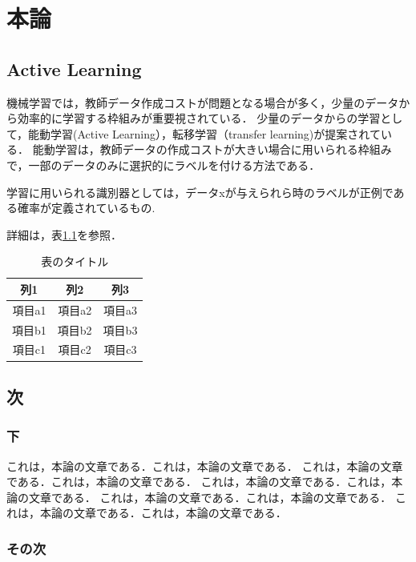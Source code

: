 \chapter{本論}

\section{Active Learning}
機械学習では，教師データ作成コストが問題となる場合が多く，少量のデータから効率的に学習する枠組みが重要視されている．
少量のデータからの学習として，能動学習(Active Learning），転移学習（transfer learning)が提案されている．
能動学習は，教師データの作成コストが大きい場合に用いられる枠組みで，一部のデータのみに選択的にラベルを付ける方法である．

学習に用いられる識別器としては，データxが与えられら時のラベルが正例である確率が定義されているもの.



詳細は，表\ref{table:sample}を参照．

\begin{table}[btp]
 \caption{\label{table:sample}表のタイトル}
 \begin{center}
  \begin{tabular}{ccc}
   \hline
   列1 & 列2 & 列3 \\
   \hline
   項目a1 & 項目a2 & 項目a3 \\
   項目b1 & 項目b2 & 項目b3 \\
   項目c1 & 項目c2 & 項目c3 \\
   \hline
  \end{tabular} 
 \end{center}
\end{table}

\section{次}

\subsection{下}

これは，本論の文章である．これは，本論の文章である．
これは，本論の文章である．これは，本論の文章である．
これは，本論の文章である．これは，本論の文章である．
これは，本論の文章である．これは，本論の文章である．
これは，本論の文章である．これは，本論の文章である．

\subsection{その次}

